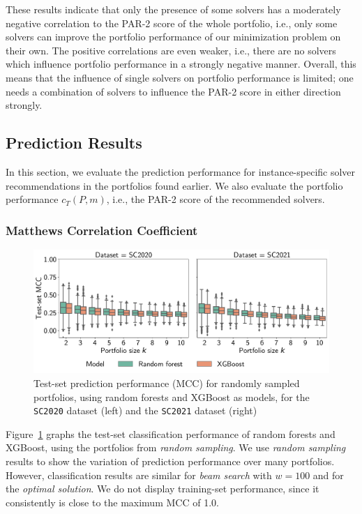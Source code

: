 \documentclass[a4paper,USenglish,pdfa]{lipics-v2021} %
\begin{document}
These results indicate that only the presence of some solvers has a moderately negative correlation to the PAR-2 score of the whole portfolio, i.e., only some solvers can improve the portfolio performance of our minimization problem on their own.
The positive correlations are even weaker, i.e., there are no solvers which influence portfolio performance in a strongly negative manner.
Overall, this means that the influence of single solvers on portfolio performance is limited; one needs a combination of solvers to influence the PAR-2 score in either direction strongly.

\subsection{Prediction Results}

In this section, we evaluate the prediction performance for instance-specific solver recommendations in the portfolios found earlier. 
We also evaluate the portfolio performance $c_T(P,m)$, i.e., the PAR-2 score of the recommended solvers.

\subsubsection{Matthews Correlation Coefficient}

\begin{figure}[htb]
	\centering
	\includegraphics[width=\columnwidth]{plots/prediction-test-mcc.pdf}
	\caption{
		Test-set prediction performance (MCC) for randomly sampled portfolios, using random forests and XGBoost as models, for the \texttt{SC2020} dataset (left) and the \texttt{SC2021} dataset (right)
	}
	\label{fig:prediction-test-mcc}
\end{figure}

Figure~\ref{fig:prediction-test-mcc} graphs the test-set classification performance of random forests and XGBoost, using the portfolios from \emph{random sampling}.
We use \emph{random sampling} results to show the variation of prediction performance over many portfolios.
However, classification results are similar for \emph{beam search} with $w=100$ and for the \emph{optimal solution}.
We do not display training-set performance, since it consistently is close to the maximum MCC of 1.0.
\end{document}
